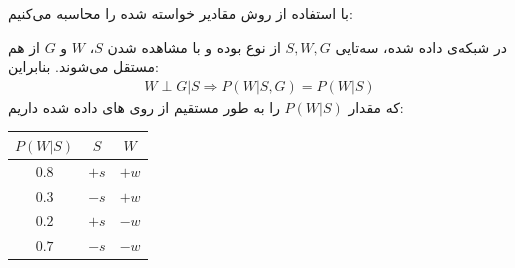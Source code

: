 \question{}

با استفاده از روش  مقادیر خواسته شده را محاسبه می‌کنیم:
\begin{ابجد}
\item در شبکه‌ی داده شده، سه‌تایی $S,W,G$ از نوع  بوده و با مشاهده شدن $S$، $W$ و $G$ از هم مستقل می‌شوند. بنابراین:
\begin{align*}
    W \perp G | S \Rightarrow P(W | S,G) = P(W | S)
\end{align*}
که مقدار $P(W|S)$ را به طور مستقیم از روی  های داده شده داریم:
\begin{table}[H]
    \centering
    \begin{tabular}{|c|c|c|}
        \hline
        $P(W|S)$ & $S$  & $W$  \\ \hline
        $0.8$    & $+s$ & $+w$ \\ \hline
        $0.3$    & $-s$ & $+w$ \\ \hline
        $0.2$    & $+s$ & $-w$ \\ \hline
        $0.7$    & $-s$ & $-w$ \\ \hline
    \end{tabular}
\end{table}


\end{ابجد}
